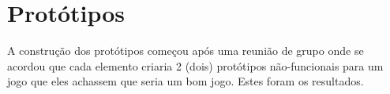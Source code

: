 \chapter{Protótipos}
\label{chap:proto}
A construção dos protótipos começou após uma reunião de grupo onde se acordou que cada elemento criaria 2 (dois) protótipos não-funcionais para um jogo que eles achassem que seria um bom jogo. Estes foram os resultados.
